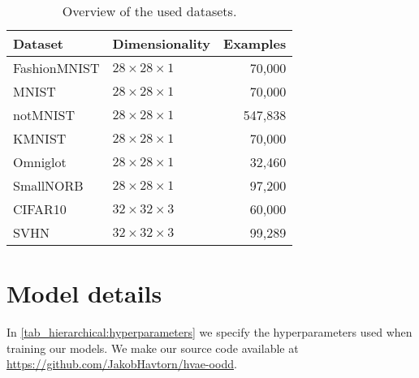 {\begin{table}[h!]
    \caption{Overview of the used datasets.}
    \centering
    \begin{tabular}{llr}
        \toprule
        Dataset & Dimensionality & Examples \\
        \midrule
        FashionMNIST \parencite{xiao_fashionmnist_2017} & $28\times28\times1$ & 70,000 \\
        MNIST \parencite{lecun_gradientbased_1998} & $28\times28\times1$ & 70,000 \\
        notMNIST \parencite{bulatov_notmnist_2011} & $28\times28\times1$ & 547,838 \\
        KMNIST \parencite{clanuwat_deep_2018} & $28\times28\times1$ & 70,000 \\
        Omniglot \parencite{lake_humanlevel_2015} & $28\times28\times1$ & 32,460 \\
        SmallNORB \parencite{lecun_learning_2004} & $28\times28\times1$ & 97,200 \\
        \midrule
        CIFAR10 \parencite{krizhevsky_learning_2009} & $32\times32\times3$ & 60,000 \\
        SVHN \parencite{netzer_reading_2011} & $32\times32\times3$ & 99,289 \\
        \bottomrule
    \end{tabular}
    \label{tab_hierarchical:datasets-overview}
\end{table}


\section{Model details}\label{sec_hierarchical:model-details}
In \cref{tab_hierarchical:hyperparameters} we specify the hyperparameters used when training our models.
We make our source code available at \url{https://github.com/JakobHavtorn/hvae-oodd}.

}

